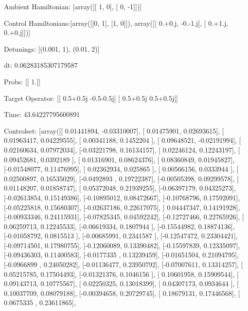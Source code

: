 \documentclass{article}
\begin{document}
    

\newpage

Ambient Hamiltonian: [array([[ 1,  0],
       [ 0, -1]])]

Control Hamiltonians:[array([[0, 1],
       [1, 0]]), array([[ 0.+0.j, -0.-1.j],
       [ 0.+1.j,  0.+0.j]])]

Detunings: [(0.001, 1), (0.01, 2)]

 dt: 0.06283185307179587

Probs: [[ 1.]]

Target Operator: [[ 0.5+0.5j -0.5-0.5j]
 [ 0.5+0.5j  0.5+0.5j]]

Time: 43.64227795600891

Controlset: [array([[ 0.01441894, -0.03310007],
       [ 0.01475901,  0.02693615],
       [ 0.01963417,  0.04229555],
       [ 0.00341188,  0.1452204 ],
       [ 0.09648521, -0.02191994],
       [ 0.02160634,  0.07972034],
       [-0.03221798,  0.16134157],
       [ 0.02246124,  0.12243197],
       [ 0.09452681,  0.0392189 ],
       [ 0.01316901,  0.08624376],
       [ 0.08360849,  0.01945827],
       [-0.01548077,  0.11476995],
       [ 0.02362934,  0.025865  ],
       [ 0.00566156,  0.0333944 ],
       [ 0.02500897,  0.16535029],
       [-0.0492893 ,  0.19722387],
       [-0.00505398,  0.09299578],
       [ 0.01148207,  0.01858747],
       [ 0.05372048,  0.21939255],
       [-0.06397179,  0.04325273],
       [-0.02613854,  0.15149386],
       [-0.10895012,  0.08472667],
       [-0.10768796,  0.17592091],
       [-0.05225818,  0.15680307],
       [-0.02637186,  0.22617075],
       [ 0.04447347,  0.14191928],
       [-0.00933346,  0.24115931],
       [-0.07825345,  0.04592242],
       [-0.12727466,  0.22765926],
       [ 0.06259713,  0.12245533],
       [-0.06619334,  0.1807944 ],
       [-0.15544982,  0.18874136],
       [-0.01058792,  0.0815513 ],
       [-0.00685991,  0.2341587 ],
       [-0.12547472,  0.23304421],
       [-0.09714501,  0.17980755],
       [-0.12060089,  0.13390482],
       [-0.15597839,  0.12335097],
       [-0.09436303,  0.11400583],
       [-0.0177335 ,  0.13239459],
       [-0.01651504,  0.21094795],
       [-0.0966899 ,  0.24050282],
       [-0.01136477,  0.23950792],
       [-0.07007611,  0.13314257],
       [ 0.05215785,  0.17504493],
       [-0.01321376,  0.1046156 ],
       [ 0.10601958,  0.15909544],
       [ 0.09143713,  0.10775567],
       [ 0.02250325,  0.13018399],
       [ 0.04307173,  0.0934644 ],
       [ 0.10037709,  0.08079188],
       [-0.00394658,  0.20729745],
       [ 0.18679131,  0.17446568],
       [ 0.0675335 ,  0.23611865],
\end{document}
